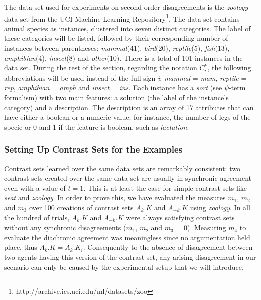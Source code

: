 The data set used for experiments on second order disagreements is the \emph{zoology} data set from the UCI Machine Learning Repository\footnote{http://archive.ics.uci.edu/ml/datasets/zoo}.
The data set contains animal species as instances, clustered into seven distinct categories. The label of these categories will be listed, followed by their corresponding number of instances between parentheses: \emph{mammal}(41), \emph{bird}(20), \emph{reptile}(5), \emph{fish}(13), \emph{amphibian}(4), \emph{insect}(8) and \emph{other}(10). There is a total of 101 instances in the data set. During the rest of the section, regarding the notation $C_{i}^{k}$, the following abbreviations will be used instead of the full sign \emph{i}: \emph{mammal} = \emph{mam}, \emph{reptile} = \emph{rep}, \emph{amphibian} = \emph{amph} and \emph{insect} = \emph{ins}.
Each instance has a \emph{sort} (see $\psi$-term formalism) with two main features: a solution (the label of the instance's category) and a description. The description is an array of 17 attributes that can have either a boolean or a numeric value: for instance, the number of legs of the specie or 0 and 1 if the feature is boolean, such as \emph{lactation}.

\subsubsection{Setting Up Contrast Sets for the Examples}

Contrast sets learned over the same data sets are remarkably consistent: two contrast sets created over the same data set are usually in synchronic agreement even with a value of $t = 1$. This is at least the case for simple contrast sets like \emph{seat} and \emph{zoology}. In order to prove this, we have evaluated the measures $m_{1}$, $m_{2}$ and $m_{3}$ over 100 creations of contrast sets $A_{k}.K$ and $A_{-k}.K$ using \emph{zoology}. In all the hundred of trials, $A_{k}.K$ and $A_{-k}.K$ were always satisfying contrast sets without any synchronic disagreements ($m_{1}$, $m_{2}$ and $m_{3}$ = 0). Measuring $m_{4}$ to evaluate the diachronic agreement was meaningless since no argumentation held place, thus $A_{k}.K = A_{k}.K_{i}$. Consequently to the absence of disagreement between two agents having this version of the contrast set, any arising disagreement in our scenario can only be caused by the experimental setup that we will introduce.

